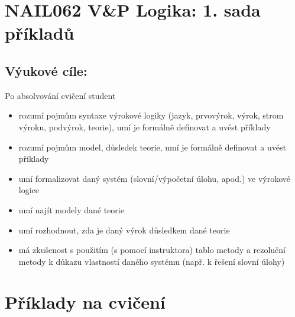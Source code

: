 \documentclass[a4paper,11pt]{amsart}
\begin{document}
\section*{NAIL062 V\&P Logika: 1. sada příkladů}

\subsection*{Výukové cíle:} Po absolvování cvičení student

    \begin{itemize}\setlength{\itemsep}{0pt}
        \item rozumí pojmům syntaxe výrokové logiky (jazyk, prvovýrok, výrok, strom výroku, podvýrok, teorie), umí je formálně definovat a uvést příklady
        \item rozumí pojmům model, důsledek teorie, umí je formálně definovat a uvést příklady
        \item umí formalizovat daný systém (slovní/výpočetní úlohu, apod.) ve výrokové logice
        \item umí najít modely dané teorie
        \item umí rozhodnout, zda je daný výrok důsledkem dané teorie
        \item má zkušenost s použitím (s pomocí instruktora) tablo metody a rezoluční metody k důkazu vlastností daného systému (např. k řešení slovní úlohy)
    \end{itemize}


\section*{Příklady na cvičení}
\end{document}

